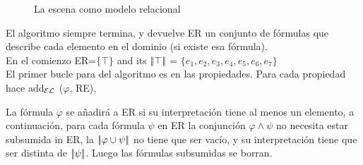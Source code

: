 \begin{figure}
\begin{minipage}[b]{0.6\linewidth}
\caption{La escena como modelo relacional}\label{GRE3D7-stimulus-graph}
\end{minipage}
\end{figure}


El algoritmo siempre termina, y devuelve ER un conjunto de f\'ormulas que describe cada elemento en el dominio (si existe esa f\'ormula). \\

En el comienzo ER=$\{\top\}$ and its $|\!|\top|\!|$ = $\{e_1, e_2, e_3, e_4, e_5, e_6, e_7\}$\\


El primer bucle para del algoritmo es en las propiedades. Para cada propiedad hace add$_\mathcal{EL}$ ($\varphi$, RE),

La f\'ormula $\varphi$ se a\~nadir\'a a ER si su interpretaci\'on tiene al menos un elemento, a continuaci\'on, para cada f\'ormula
 $\psi$ en ER la conjunci\'on
$\varphi  \wedge \psi$ no necesita estar subsumida in ER, la $|\!|\varphi \cup \psi|\!|$ no tiene que ser vac\'io, y su interpretaci\'on tiene que ser distinta de $|\!|\psi|\!|$. Luego las f\'ormulas subsumidas se borran.

